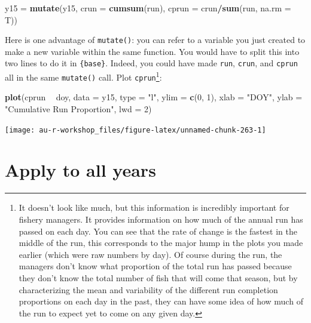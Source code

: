 \documentclass[]{book}
\newenvironment{Shaded}{\begin{snugshade}}{\end{snugshade}}
\newcommand{\DataTypeTok}[1]{\textcolor[rgb]{0.13,0.29,0.53}{#1}}
\newcommand{\DecValTok}[1]{\textcolor[rgb]{0.00,0.00,0.81}{#1}}
\newcommand{\KeywordTok}[1]{\textcolor[rgb]{0.13,0.29,0.53}{\textbf{#1}}}
\newcommand{\NormalTok}[1]{#1}
\newcommand{\OperatorTok}[1]{\textcolor[rgb]{0.81,0.36,0.00}{\textbf{#1}}}
\newcommand{\StringTok}[1]{\textcolor[rgb]{0.31,0.60,0.02}{#1}}
\let\rmarkdownfootnote\footnote%
\def\footnote{\protect\rmarkdownfootnote}
\begin{document}
\begin{Shaded}
\begin{Highlighting}[]
\NormalTok{y15 =}\StringTok{ }\KeywordTok{mutate}\NormalTok{(y15, }\DataTypeTok{crun =} \KeywordTok{cumsum}\NormalTok{(run), }\DataTypeTok{cprun =}\NormalTok{ crun}\OperatorTok{/}\KeywordTok{sum}\NormalTok{(run, }\DataTypeTok{na.rm =}\NormalTok{ T))}
\end{Highlighting}
\end{Shaded}

Here is one advantage of \texttt{mutate()}: you can refer to a variable you just created to make a new variable within the same function. You would have to split this into two lines to do it in \texttt{\{base\}}. Indeed, you could have made \texttt{run}, \texttt{crun}, and \texttt{cprun} all in the same \texttt{mutate()} call. Plot \texttt{cprun}\footnote{It doesn't look like much, but this information is incredibly important for fishery managers. It provides information on how much of the annual run has passed on each day. You can see that the rate of change is the fastest in the middle of the run, this corresponds to the major hump in the plots you made earlier (which were raw numbers by day). Of course during the run, the managers don't know what proportion of the total run has passed because they don't know the total number of fish that will come that season, but by characterizing the mean and variability of the different run completion proportions on each day in the past, they can have some idea of how much of the run to expect yet to come on any given day.}:

\begin{Shaded}
\begin{Highlighting}[]
\KeywordTok{plot}\NormalTok{(cprun }\OperatorTok{~}\StringTok{ }\NormalTok{doy, }\DataTypeTok{data =}\NormalTok{ y15, }\DataTypeTok{type =} \StringTok{"l"}\NormalTok{, }\DataTypeTok{ylim =} \KeywordTok{c}\NormalTok{(}\DecValTok{0}\NormalTok{, }\DecValTok{1}\NormalTok{),}
     \DataTypeTok{xlab =} \StringTok{"DOY"}\NormalTok{, }\DataTypeTok{ylab =} \StringTok{"Cumulative Run Proportion"}\NormalTok{, }\DataTypeTok{lwd =} \DecValTok{2}\NormalTok{)}
\end{Highlighting}
\end{Shaded}

\begin{center}\texttt{[image: au-r-workshop\_files/figure-latex/unnamed-chunk-263-1]} \end{center}

\hypertarget{apply-to-all-years}{%
\section{Apply to all years}\label{apply-to-all-years}}
\end{document}
